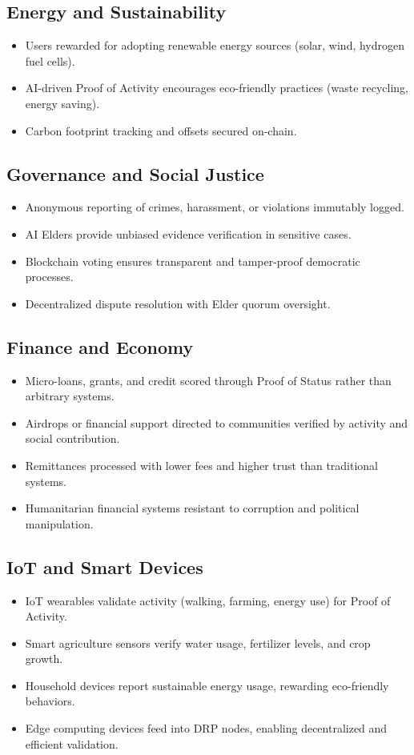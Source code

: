 \documentclass[11pt,a4paper]{article}
\begin{document}
\subsection{Energy and Sustainability}
\begin{itemize}
    \item Users rewarded for adopting renewable energy sources (solar, wind, hydrogen fuel cells).
    \item AI-driven Proof of Activity encourages eco-friendly practices (waste recycling, energy saving).
    \item Carbon footprint tracking and offsets secured on-chain.
\end{itemize}

\subsection{Governance and Social Justice}
\begin{itemize}
    \item Anonymous reporting of crimes, harassment, or violations immutably logged.
    \item AI Elders provide unbiased evidence verification in sensitive cases.
    \item Blockchain voting ensures transparent and tamper-proof democratic processes.
    \item Decentralized dispute resolution with Elder quorum oversight.
\end{itemize}

\subsection{Finance and Economy}
\begin{itemize}
    \item Micro-loans, grants, and credit scored through Proof of Status rather than arbitrary systems.
    \item Airdrops or financial support directed to communities verified by activity and social contribution.
    \item Remittances processed with lower fees and higher trust than traditional systems.
    \item Humanitarian financial systems resistant to corruption and political manipulation.
\end{itemize}

\subsection{IoT and Smart Devices}
\begin{itemize}
    \item IoT wearables validate activity (walking, farming, energy use) for Proof of Activity.
    \item Smart agriculture sensors verify water usage, fertilizer levels, and crop growth.
    \item Household devices report sustainable energy usage, rewarding eco-friendly behaviors.
    \item Edge computing devices feed into DRP nodes, enabling decentralized and efficient validation.
\end{itemize}
\end{document}
